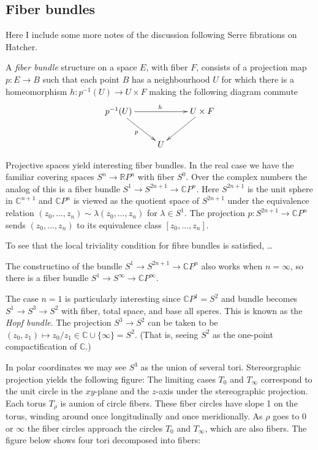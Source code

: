 \subsection{Fiber bundles}
\label{subsection-fiber-bundles}

Here I include some more notes of the
discussion following Serre fibrations on
Hatcher.

	A {\it fiber bundle} structure on a space
	$E$, with fiber $F$, consists of a
	projection map $p:E\to B$ such that each
	point $B$ has a neighbourhood $U$ for which
	there is a homeomorphism $h:p^{-1}(U)\to
	U\times F$ making the following diagram
	commute
	$$
	\xymatrix{
		p^{-1}(U)\ar[rr]^{h}\ar[dr]_{p}
		&&U\times F\ar[dl]\\
		&U
	}
	$$
\begin{example}
\label{example-proje-space-yield-inter}
Projective spaces yield interesting fiber
bundles. In the real case we have the
familiar covering spaces $S^n\to\mathbb{R}
P^n$ with fiber $S^0$. Over the complex
numbers the analog of this is a fiber bundle
$S^1\to S^{2n+1}\to\mathbb{C} P^n$. Here
$S^{2n+1}$ is the unit sphere in
$\mathbb{C}^{n+1}$ and $\mathbb{C} P^n$ is
viewed as the quotient space of $S^{2n+1}$
under the equivalence relation
$(z_0,\ldots,z_n)\sim\lambda(z_0,\ldots,z_n)$
for $\lambda\in S^1$. The projection
$p:S^{2n+1}\to\mathbb{C} P^n$ sends
$(z_0,\ldots,z_n)$ to its equivalence class
$[z_0,\ldots,z_n]$.

To see that the local triviality condition
for fibre bundles is satisfied, …

	The constructino of the bundle $S^1\to
	S^{2n+1}\to\mathbb{C} P^n$ also works when
	$n=\infty$, so there is a fiber bundle
	$S^1\to S^\infty\to \mathbb{C} P^\infty$.

	The case $n=1$ is particularly interesting
	since $\mathbb{C} P^1=S^2$ and bundle
	becomes $S^1\to S^3\to S^2$ with fiber,
	total space, and base all speres. This is
	known as the {\it Hopf bundle}. The
	projection $S^3\to S^2$ can be taken to be
	$(z_0,z_1)\mapsto
	z_0/z_1\in\mathbb{C}\cup\{\infty\}=S^2$.
	(That is, seeing $S^2$ as the one-point
	compactification of $\mathbb{C}$.)

	In polar coordinates we may see $S^3$ as the
	union of several tori. Stereorgraphic
	projection yields the following figure:
	The limiting cases $T_0$ and $T_\infty$
	correspond to the unit circle in the
	$xy$-plane and the $z$-axis under the
	stereographic projection.	Each torus
	$T_\rho$ is aunion of circle fibers. These
	fiber circles have slope 1 on the torus,
	winding around once longitudinally and once
	meridionally. As $\rho$ goes to $0$ or
	$\infty$ the fiber circles approach the
	circles $T_0$ and $T_\infty$, which are also
	fibers. The figure below shows four tori
	decomposed into fibers:


\end{example}
